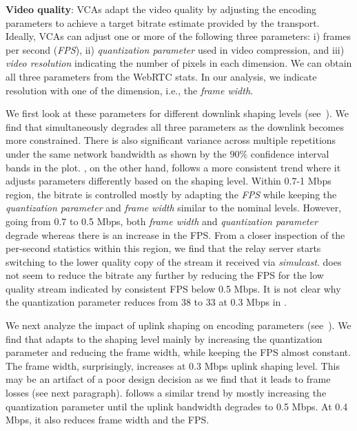 \textbf{Video quality}: VCAs adapt the video quality by adjusting the encoding parameters to achieve a target bitrate estimate provided by the transport. Ideally, VCAs can adjust one or more of the following three parameters: i) frames per second (\textit{FPS}), ii) \textit{quantization parameter} used in video compression, and  iii) \textit{video resolution} indicating the number of pixels in each dimension. We can obtain all three parameters from the WebRTC stats. In our analysis, we indicate resolution with one of the dimension, i.e., the \textit{frame width}. 

We first look at these parameters for different downlink shaping levels (see~). We find that \teamsbrowser simultaneously degrades all three parameters as the downlink becomes more constrained. There is also significant variance across multiple repetitions under the same network bandwidth as shown by the $90\%$ confidence interval bands in the plot. \meet, on the other hand, follows a more consistent trend where it adjusts parameters differently based on the shaping level. Within 0.7-1 Mbps region, the bitrate is controlled mostly by adapting the \textit{FPS} while keeping the \textit{quantization parameter} and \textit{frame width} similar to the nominal levels. However, going from 0.7 to 0.5 Mbps, both \textit{frame width} and \textit{quantization parameter} degrade whereas there is an increase in the FPS. From a closer inspection of the per-second statistics within this region, we find that the relay server starts switching to the lower quality copy of the stream it received via \textit{simulcast}. \meet does not seem to reduce the bitrate any further by reducing the FPS for the low quality stream indicated by consistent FPS below 0.5 Mbps. It is not clear why the quantization parameter reduces from 38 to 33 at 0.3 Mbps in \meet. 

We next analyze the impact of uplink shaping on encoding parameters (see~). We find that \teams adapts to the shaping level mainly by increasing the quantization parameter and reducing the frame width, while keeping the FPS almost constant. The frame width, surprisingly, increases at 0.3 Mbps uplink shaping level. This may be an artifact of a poor design decision as we find that it leads to frame losses (see next paragraph). \meet follows a similar trend by mostly increasing the quantization parameter until the uplink bandwidth degrades to 0.5 Mbps. At 0.4 Mbps, it also reduces frame width and the FPS. 

